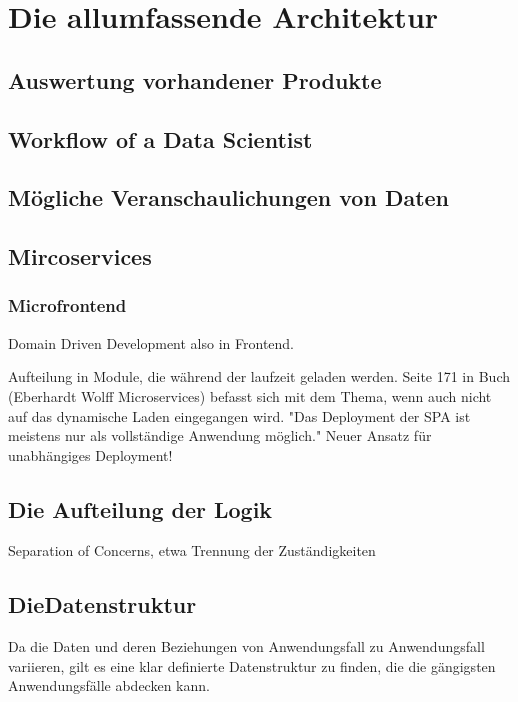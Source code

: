 \chapter{Die allumfassende Architektur}
\label{chap:die-allumfassende-architektur}

\section{Auswertung vorhandener Produkte}

\section{Workflow of a Data Scientist}

\section{Mögliche Veranschaulichungen von Daten}

\section{Mircoservices}

\subsection{Microfrontend}
Domain Driven Development also in Frontend.

Aufteilung in Module, die während der laufzeit geladen werden.
Seite 171 in Buch (Eberhardt Wolff Microservices) befasst sich mit dem
Thema, wenn auch nicht auf das dynamische Laden eingegangen wird.
"Das Deployment der SPA ist meistens nur als vollständige Anwendung möglich."
Neuer Ansatz für unabhängiges Deployment!

\section{Die Aufteilung der Logik}
\label{sec:die-aufteilung-der-logic}
Separation of Concerns, etwa Trennung der Zuständigkeiten

\section{DieDatenstruktur}
Da die Daten und deren Beziehungen von Anwendungsfall zu Anwendungsfall
variieren, gilt es eine klar definierte Datenstruktur zu finden, die
die gängigsten Anwendungsfälle abdecken kann. 


